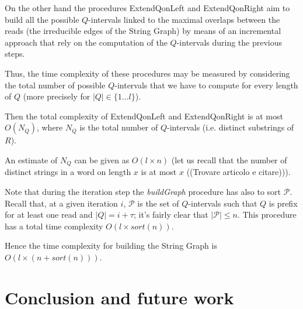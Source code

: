 \documentclass[runningheads,envcountsame,a4paper]{llncs}
\begin{document}
On the other hand the procedures ExtendQonLeft and ExtendQonRight aim to
build all the possible $Q$-intervals linked to the maximal overlaps
between the reads (the irreducible edges of the String Graph) by means of
an incremental approach that rely on the computation of the
$Q$-intervals during the previous steps.

Thus, the time complexity of these procedures may be measured by
considering the total number of possible $Q$-intervals that we have to
compute for every length of $Q$ (more precisely for $|Q| \in \{1 \dots
l\}$).

Then the total  complexity of ExtendQonLeft and ExtendQonRight is at
most $O(N_Q)$, where $N_Q$ is the total number of
$Q$-intervals (i.e. distinct substrings of $R$).

An estimate of $N_Q$ can be given as $O(l \times n)$ (let us recall that
the number of distinct strings in a word on length $x$ is  at most $x$
((Trovare articolo e citare)\cite{})).

Note that during the iteration step the \emph{buildGraph} procedure has also to
sort $\mathcal{P}$.
Recall that, at a given iteration $i$, $\mathcal{P}$ is the set of
$Q$-intervals such that $Q$ is prefix for at least one read and $|Q| = i
+ \tau$; it's fairly clear that $|\mathcal{P}| \leq n$.
This procedure has a total time complexity $O(l \times
sort(n))$.

Hence the time complexity for building the String Graph is
$O(l \times (n + sort(n)))$.



\section{Conclusion and future work}
%
\end{document}
